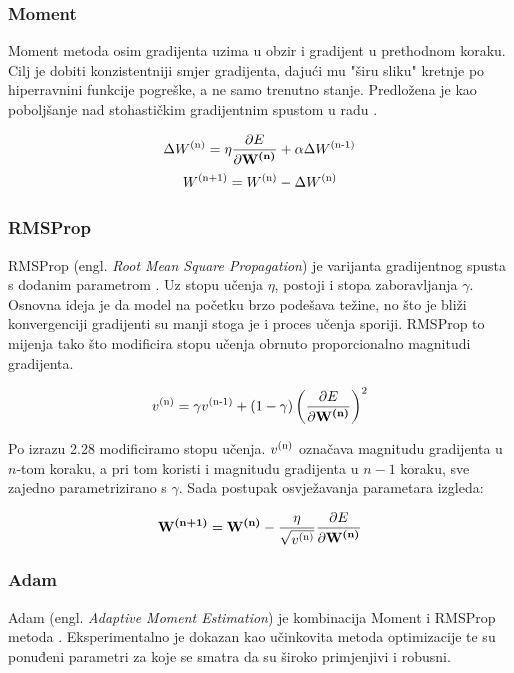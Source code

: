 \documentclass[times, utf8, diplomski]{fer}
\begin{document}
\subsubsection{Moment}
Moment metoda osim gradijenta uzima u obzir i gradijent u prethodnom koraku. Cilj je dobiti konzistentniji smjer gradijenta, dajući mu "širu sliku" kretnje po hiperravnini funkcije pogreške, a ne samo trenutno stanje. Predložena je kao poboljšanje nad stohastičkim gradijentnim spustom u radu \cite{backprop}.

\begin{equation}
\Delta W\textsuperscript{(n)} = \eta\frac{\partial E}{\partial \textbf{W\textsuperscript{(n)}}} + \alpha \Delta W\textsuperscript{(n-1)}
\end{equation}
\begin{equation}
W\textsuperscript{(n+1)} = W\textsuperscript{(n)} - \Delta W\textsuperscript{(n)}
\end{equation}

\subsubsection{RMSProp}
RMSProp (engl. \textit{Root Mean Square Propagation}) je varijanta gradijentnog spusta s dodanim parametrom \cite{rmsprop}. Uz stopu učenja $\eta$, postoji i stopa zaboravljanja $\gamma$. Osnovna ideja je da model na početku brzo podešava težine, no što je bliži konvergenciji gradijenti su manji stoga je i proces učenja sporiji. RMSProp to mijenja tako što modificira stopu učenja obrnuto proporcionalno magnitudi gradijenta.

\begin{equation}
v\textsuperscript{(n)} = \gamma v\textsuperscript{(n-1)} + (1-\gamma)\left(\frac{\partial E}{\partial \textbf{W\textsuperscript{(n)}}}\right)^2
\end{equation}

Po izrazu 2.28 modificiramo stopu učenja. $v\textsuperscript{(n)}$ označava magnitudu gradijenta u $n$-tom koraku, a pri tom koristi i magnitudu gradijenta u $n-1$ koraku, sve zajedno parametrizirano s $\gamma$. Sada postupak osvježavanja parametara izgleda:

\begin{equation}
\textbf{W\textsuperscript{(n+1)}} = \textbf{W\textsuperscript{(n)}} - \frac{\eta}{\sqrt{v\textsuperscript{(n)}}}\frac{\partial E}{\partial \textbf{W\textsuperscript{(n)}}}
\end{equation}

\subsubsection{Adam}
Adam (engl. \textit{Adaptive Moment Estimation}) je kombinacija Moment i RMSProp metoda \cite{adam}. Eksperimentalno je dokazan kao učinkovita metoda optimizacije te su ponuđeni parametri za koje se smatra da su široko primjenjivi i robusni.
\end{document}
